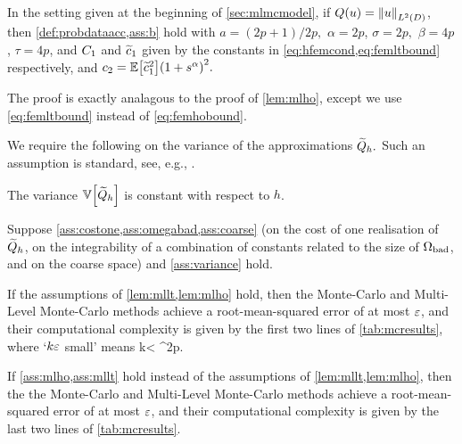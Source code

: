 \ble[Verifying assumptions for $Q(u) = \NLtD{u}$]\label{lem:mllt}
In the setting given at the beginning of \cref{sec:mlmcmodel}, if $Q(u) = \NLtD{u}$, then \cref{def:probdataacc,ass:b} hold with $a=(2p+1)/2p,$ $\alpha = 2p$, $\sigma = 2p,$ $\beta = 4p$, $\tau = 4p$, and $C_{1}$ and $\widetilde{c}_{1}$ given by the constants in \cref{eq:hfemcond,eq:femltbound} respectively, and $\ct = \EXP{\cotilde^2}\mleft(1+s^\alpha\mright)^2.$
\ele

The proof is exactly analagous to the proof of \cref{lem:mlho}, except we use \cref{eq:femltbound} instead of \cref{eq:femhobound}.
\epf



We require the following  on the variance of the approximations $\widetilde{Q}_{h}.$ Such an assumption is standard, see, e.g., \cite[Text below equation (3)]{ClGiScTe:11}.

\bas\label{ass:variance}
The variance $\VAR{\Qhtilde}$ is constant with respect to $h$.
\eas


Suppose \cref{ass:costone,ass:omegabad,ass:coarse} (on the cost of one realisation of $\widetilde{Q}_{h}$, on the integrability of a combination of constants related to the size of $\Omega_{\mathrm{bad}}$, and on the coarse space)  and \cref{ass:variance} hold.

\ben
\item If the assumptions of \cref{lem:mllt,lem:mlho} hold, then the Monte-Carlo and Multi-Level Monte-Carlo methods achieve a root-mean-squared error of at most $\varepsilon$, and their computational complexity is given by  the first two lines of \cref{tab:mcresults}, where `$k\varepsilon$ small' means
\beq\label{eq:kepscond}
k\eps < \co \Ccoarse^{2p}.
\eeq

\item If \cref{ass:mlho,ass:mllt} hold instead of the assumptions of \cref{lem:mllt,lem:mlho}, then the the Monte-Carlo and Multi-Level Monte-Carlo methods achieve a root-mean-squared error of at most $\varepsilon$, and their computational complexity is given by the last two lines of \cref{tab:mcresults}.
  \een
\label{thm:mcmlmchelmholtz}
\enth

